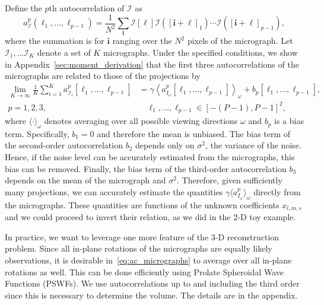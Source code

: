 \documentclass[english,11pt]{article}
\newcommand{\1}{\mathbf{1}}
\newcommand{\II}{\mathcal{I}}
\newcommand{\mb}{\mathbf}
\newcommand*\Bell{\ensuremath{\boldsymbol\ell}}
\newcommand{\TODO}[1]{{\color{red}{[#1]}}}
\numberwithin{equation}{section}
\theoremstyle{plain}
\theoremstyle{definition}
\theoremstyle{remark}
\theoremstyle{plain}
\theoremstyle{remark}
\theoremstyle{plain}
\theoremstyle{plain}
\newcommand{\tamir}{x}
\begin{document}
Define the $p$th autocorrelation of $\II$ as
\begin{equation*} \label{eq:Kth_autocorrelation}
a^p_\II(\Bell_1,\ldots, \Bell_{p-1}) = \frac{1}{N^2}\sum_{\mb i}\II[\Bell]\II([\mb i+\Bell]_1)\cdots \II([\mb i+\Bell]_{p-1}),
\end{equation*}
where the summation is for $\mb i $ ranging over the $N^2$  pixels of the micrograph. %
Let $\II_1,\ldots\II_K$ denote a set of $K$ micrographs. 
Under the specified conditions, we show in Appendix~\ref{sec:moment_derivation} that the first three autocorrelations  of the micrographs are related to those of the projections by \begin{align} \label{eq:ac_micrographs}
\lim_{K\to\infty}\frac{1}{K}\sum_{i=1}^Ka^p_{\II_i}[\Bell_1,\ldots,\Bell_{p-1}]  &= \gamma\left\langle a^p_{I_\omega}[\Bell_1,\ldots,\Bell_{p-1}]\right\rangle_{\omega} + b_p[\Bell_1,\ldots,\Bell_{p-1}], \\ p=1,2,3,& \quad \Bell_1,\ldots,\Bell_{p-1}\in[-(P-1),P-1]^2, \nonumber
\end{align}
where $\langle\cdot\rangle_\omega$ denotes averaging over all possible viewing directions $\omega$ and $b_p$ is a bias term. %
Specifically,  $b_1 = 0$ and therefore the mean is unbiased. The bias term of the second-order autocorrelation  $b_2$ depends only on $\sigma^2$, the variance of the noise. Hence, if the noise level can be accurately estimated from the micrographs, this bias can be removed. 
Finally, the bias term of the third-order autocorrelation $b_3$ depends on the mean of the micrograph and $\sigma^2$.  Therefore, given sufficiently many projections, we can accurately estimate the quantities $\gamma\langle a^p_{I_{\omega}}\rangle_{\omega}$ directly from the micrographs. These quantities are functions of the unknown coefficients $\tamir_{l,m,s}$ and we could proceed to invert their relation, as we did in the 2-D toy example. 

In practice, we want to leverage one more feature of the 3-D reconstruction problem.
Since all in-plane rotations of the micrographs are equally likely observations, 
it is desirable in~\eqref{eq:ac_micrographs} to average over all in-plane rotations as well.
This can be done efficiently using Prolate Spheroidal Wave Functions (PSWFs).  We use autocorrelations up to and including the  third order since this is necessary to  determine the volume.
The details are in the appendix. 
\end{document}
